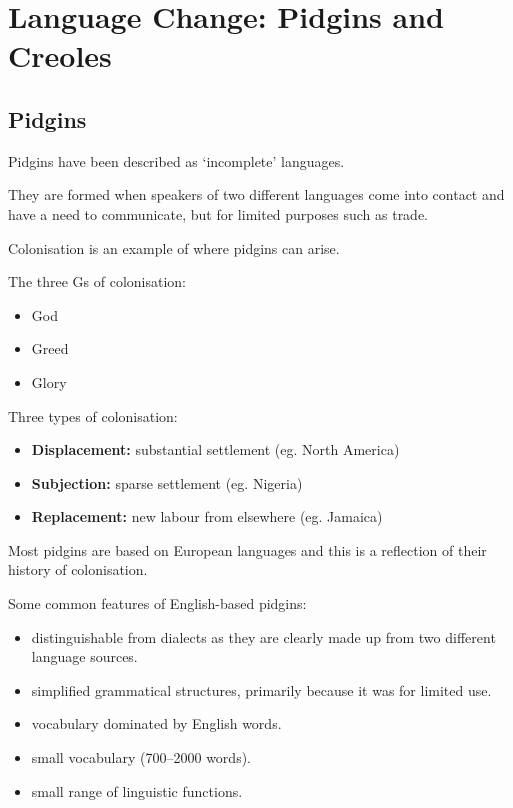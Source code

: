 \documentclass[../main.tex]{subfiles}
\begin{document}
    \section{Language Change: Pidgins and Creoles}

    \subsection{Pidgins}
    Pidgins have been described as `incomplete' languages. \par
    They are formed when speakers of two different languages come into contact and have a need to communicate, but for limited purposes such as trade. \par
    Colonisation is an example of where pidgins can arise. \par
    
    The three Gs of colonisation:
    \begin{itemize}
        \item God
        \item Greed
        \item Glory
    \end{itemize}

    Three types of colonisation: 
    \begin{itemize}
        \item \textbf{Displacement:} substantial settlement (eg. North America)
        \item \textbf{Subjection:} sparse settlement (eg. Nigeria)
        \item \textbf{Replacement:} new labour from elsewhere (eg. Jamaica)
    \end{itemize}
    Most pidgins are based on European languages and this is a reflection of their history of colonisation.


    Some common features of English-based pidgins:
    \begin{itemize}
        \item distinguishable from dialects as they are clearly made up from two different language sources.
        \item simplified grammatical structures, primarily because it was for limited use.
        \item vocabulary dominated by English words.
        \item small vocabulary (700--2000 words).
        \item small range of linguistic functions.
    \end{itemize}
\end{document}
